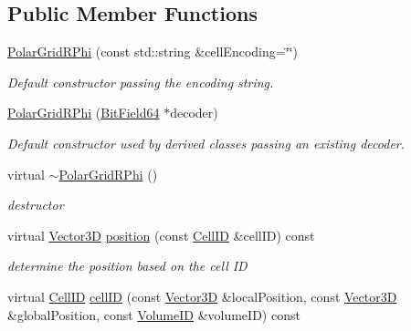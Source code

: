 \subsection*{Public Member Functions}
\begin{DoxyCompactItemize}
\item 
\hyperlink{class_d_d4hep_1_1_d_d_segmentation_1_1_polar_grid_r_phi_a1894c699445be28e281dc8e292c70efb}{PolarGridRPhi} (const std::string \&cellEncoding=\char`\"{}\char`\"{})
\begin{DoxyCompactList}\small\item\em Default constructor passing the encoding string. \item\end{DoxyCompactList}\item 
\hyperlink{class_d_d4hep_1_1_d_d_segmentation_1_1_polar_grid_r_phi_aca178a8d2d6a77ea6e33dddb479bbbd9}{PolarGridRPhi} (\hyperlink{class_d_d4hep_1_1_d_d_segmentation_1_1_bit_field64}{BitField64} $\ast$decoder)
\begin{DoxyCompactList}\small\item\em Default constructor used by derived classes passing an existing decoder. \item\end{DoxyCompactList}\item 
virtual \hyperlink{class_d_d4hep_1_1_d_d_segmentation_1_1_polar_grid_r_phi_a6801dd3c1227633c1865d9f4acf3b7cb}{$\sim$PolarGridRPhi} ()
\begin{DoxyCompactList}\small\item\em destructor \item\end{DoxyCompactList}\item 
virtual \hyperlink{struct_d_d4hep_1_1_d_d_segmentation_1_1_vector3_d}{Vector3D} \hyperlink{class_d_d4hep_1_1_d_d_segmentation_1_1_polar_grid_r_phi_a91f53cd5367a3b7472713e2bd214bf57}{position} (const \hyperlink{namespace_d_d4hep_1_1_d_d_segmentation_ac7af071d85cb48820914434a07e21ba1}{CellID} \&cellID) const 
\begin{DoxyCompactList}\small\item\em determine the position based on the cell ID \item\end{DoxyCompactList}\item 
virtual \hyperlink{namespace_d_d4hep_1_1_d_d_segmentation_ac7af071d85cb48820914434a07e21ba1}{CellID} \hyperlink{class_d_d4hep_1_1_d_d_segmentation_1_1_polar_grid_r_phi_adb32acd7b9fda25d500d4f89c5ac0e6c}{cellID} (const \hyperlink{struct_d_d4hep_1_1_d_d_segmentation_1_1_vector3_d}{Vector3D} \&localPosition, const \hyperlink{struct_d_d4hep_1_1_d_d_segmentation_1_1_vector3_d}{Vector3D} \&globalPosition, const \hyperlink{namespace_d_d4hep_1_1_d_d_segmentation_a61a6833a18d1800bdef176595f83e3ba}{VolumeID} \&volumeID) const 

\end{DoxyCompactItemize}

